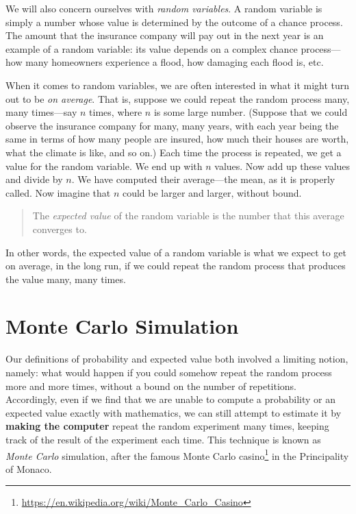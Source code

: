 \documentclass[]{book}
\let\rmarkdownfootnote\footnote%
\def\footnote{\protect\rmarkdownfootnote}
\renewcommand{\href}[2]{#2\footnote{\url{#1}}}
\renewcommand{\href}[2]{#2\footnote{\url{#1}}}
\theoremstyle{definition}
\theoremstyle{definition}
\theoremstyle{definition}
\theoremstyle{remark}
\begin{document}
{We will also concern ourselves with \emph{random variables}.
A random variable is simply a number whose value
is determined by the outcome of a chance process. The amount that the
insurance company will pay out in the next year is an example of a
random variable: its value depends on a complex chance process---how
many homeowners experience a flood, how damaging each flood is, etc.

When it comes to random variables, we are often interested in what it
might turn out to be \emph{on average}. That is, suppose we could repeat
the random process many, many times---say \(n\) times, where \(n\) is
some large number. (Suppose that we could observe the insurance company
for many, many years, with each year being the same in terms of how many
people are insured, how much their houses are worth, what the climate is
like, and so on.) Each time the process is repeated, we get a value for
the random variable. We end up with \(n\) values. Now add up these
values and divide by \(n\). We have computed their average---the mean,
as it is properly called. Now imagine that \(n\) could be larger and
larger, without bound.

\begin{quote}
The \emph{expected value} of the random variable
is the number that this average converges to.
\end{quote}

In other words, the expected value of a random variable is what we
expect to get on average, in the long run, if we could repeat the random
process that produces the value many, many times.

\section{Monte Carlo Simulation}\label{monte-carlo-simulation}

Our definitions of probability and expected value both involved a
limiting notion, namely: what would happen if you could somehow repeat
the random process more and more times, without a bound on the number of
repetitions. Accordingly, even if we find that we are unable to compute
a probability or an expected value exactly with mathematics, we can
still attempt to estimate it by \textbf{making the computer} repeat the
random experiment many times, keeping track of the result of the
experiment each time. This technique is known as \emph{Monte Carlo}
simulation, after the famous
\href{https://en.wikipedia.org/wiki/Monte_Carlo_Casino}{Monte Carlo
casino} in the Principality of Monaco.

}
\end{document}
